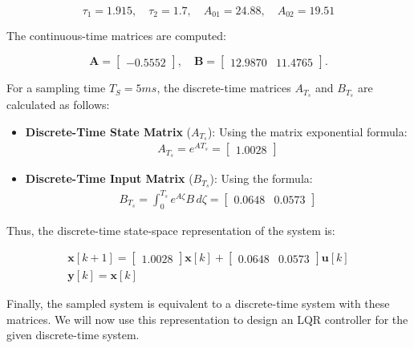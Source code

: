 \[
\tau_1 = 1.915, \quad \tau_2 = 1.7, \quad A_{01} = 24.88, \quad A_{02} = 19.51
\]

The continuous-time matrices are computed:

\[
\mathbf{A} = 
\begin{bmatrix}
-0.5552
\end{bmatrix}, \quad 
\mathbf{B} = 
\begin{bmatrix}
12.9870 & 11.4765
\end{bmatrix}.
\]

For a sampling time $T_S = 5 ms$, the discrete-time matrices \( A_{T_s} \) and \( B_{T_s} \) are calculated as follows:

\begin{itemize}
    \item \textbf{Discrete-Time State Matrix} (\(A_{T_s}\)): 
   Using the matrix exponential formula:
   \begin{gather*}
        A_{T_s} = e^{A T_s} = \begin{bmatrix} 1.0028 \end{bmatrix}    
   \end{gather*}
   

\end{itemize}


\begin{itemize} 
    \item \textbf{Discrete-Time Input Matrix} (\(B_{T_s}\)): 
   Using the formula:
   \begin{gather*}
    B_{T_s} = \int_0^{T_s} e^{A \zeta} B \, d\zeta = \begin{bmatrix} 0.0648 & 0.0573\end{bmatrix}    
   \end{gather*}
   
\end{itemize}

Thus, the discrete-time state-space representation of the system is:

\begin{gather*}
    \mathbf{x}[k+1] = 
        \begin{bmatrix} 1.0028 \end{bmatrix} \mathbf{x}[k] 
    + \begin{bmatrix} 0.0648 & 0.0573 \end{bmatrix} \mathbf{u}[k]\\
    \mathbf{y}[k] = \mathbf{x}[k]
\end{gather*}


Finally, the sampled system is equivalent to a discrete-time system with these matrices. We will now use this representation to design an LQR controller for the given discrete-time system.

